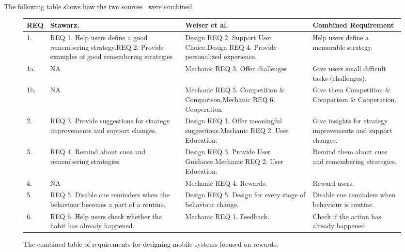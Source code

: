 The following table shows how the two sources~\cite{thesis_kathy, article_taxonomy_motivational_affordances_meaningful} were combined.

\begin{landscape}
\renewcommand{\arraystretch}{1.5} %
\begin{figure}[ht] %


\begin{center}
\begin{tabular}{ |p{.9cm}|p{6.5cm}|p{6.5cm}|p{5.8cm}| }
  \hline
  \textbf{REQ} & \textbf{Stawarz.~\cite{thesis_kathy}} & \textbf{Weiser et al.~\cite{article_taxonomy_motivational_affordances_meaningful}} & \textbf{Combined Requirement} \\ \hline %
  1.  & REQ 1. Help users define a good remembering strategy.\newline REQ 2. Provide examples of good remembering strategies & Design REQ 2. Support User Choice.\newline Design REQ 4. Provide personalized experience. & Help users define a memorable strategy. \\ \hline
  1a. & N\/A & Mechanic REQ 3. Offer challenges & Give users small difficult tasks (challenges). \\ \hline
  1b. & N\/A & Mechanic REQ 5. Competition \& Comparison.\newline Mechanic REQ 6. Cooperation & Give them Competition \& Comparison \& Cooperation. \\ \hline
  2.  & REQ 3. Provide suggestions for strategy improvements and support changes. & Design REQ 1. Offer meaningful suggestions.\newline Mechanic REQ 2. User Education. & Give insights for strategy improvements and support changes. \\ \hline
  3.  & REQ 4. Remind about cues and remembering strategies. & Design REQ 3. Provide User Guidance.\newline Mechanic REQ 2. User Education. & Remind them about cues and remembering strategies. \\ \hline
  4.  & N\/A & Mechanic REQ 4. Rewards. & Reward users. \\ \hline
  5.  & REQ 5. Disable cue reminders when the behaviour becomes a part of a routine. & Design REQ 5. Design for every stage of behaviour change. & Disable cue reminders when behaviour is routine. \\ \hline
  6.  & REQ 6. Help users check whether the habit has already happened. & Mechanic REQ 1. Feedback. & Check if the action has already happened. \\ \hline
\end{tabular}
\end{center}

    \caption{The combined table of requirements for designing mobile systems focused on rewards.}
    \label{fig:reqtable}
\end{figure}
\newpage
\end{landscape}

